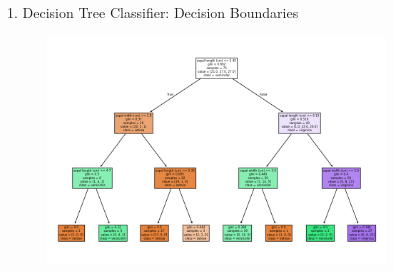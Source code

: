\documentclass[aspectratio=169,xcolor=dvipsnames]{beamer}
\begin{document}
\begin{frame}{1. Decision Tree Classifier: Decision Boundaries}

    \begin{figure}
        \centering
        \includegraphics[height=0.8\textheight, width=0.8\textwidth, keepaspectratio]{out/plot9_DT_structure.png}
        \label{fig:1}
    \end{figure}

\end{frame}
\end{document}

